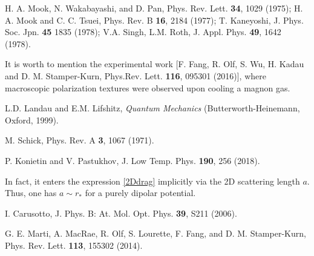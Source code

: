 \documentclass[reprint,superscriptaddress,showpacs,nofootinbib,aps,pra]{revtex4-1}
\begin{document}
\begin{thebibliography}{99}
 H. A. Mook, N. Wakabayashi, and D. Pan, Phys. Rev. Lett. \textbf{34}, 1029 (1975); H. A. Mook and C. C. Tsuei, Phys. Rev. B \textbf{16}, 2184 (1977); T. Kaneyoshi, J. Phys. Soc. Jpn. \textbf{45} 1835 (1978);  V.A. Singh, L.M. Roth, J. Appl. Phys. \textbf{49}, 1642 (1978).

 It is worth to mention the experimental work [F. Fang, R. Olf, S. Wu, H. Kadau and D. M. Stamper-Kurn, Phys.Rev. Lett. \textbf{116}, 095301 (2016)], where macroscopic polarization textures were observed upon cooling a magnon gas. 

 L.D. Landau and E.M. Lifshitz, \textit{Quantum Mechanics}  (Butterworth-Heinemann, Oxford, 1999).

 M. Schick, Phys. Rev. A \textbf{3}, 1067 (1971).

 P. Konietin and V. Pastukhov, J. Low Temp. Phys. \textbf{190}, 256 (2018).

 In fact, it enters the expression \eqref{2Ddrag} implicitly via the 2D scattering length $a$. Thus, one has $a\sim r_\ast$ for a purely dipolar potential.

 I. Carusotto, J. Phys. B: At. Mol. Opt. Phys. \textbf{39}, S211 (2006).

 G. E. Marti, A. MacRae, R. Olf, S. Lourette, F. Fang, and D. M. Stamper-Kurn, Phys. Rev. Lett. \textbf{113}, 155302 (2014).

\end{thebibliography}
\end{document}
